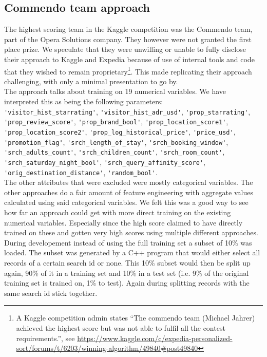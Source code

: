 \documentclass{llncs}
\begin{document}
\subsection{Commendo team approach}
The highest scoring team in the Kaggle competition was the Commendo team, part of the Opera Solutions company. They however were not granted the first place prize. We speculate that they were unwilling or unable to fully disclose their approach to Kaggle and Expedia because of use of internal tools and code that they wished to remain proprietary\footnote{A Kaggle competition admin states ``The commendo team (Michael Jahrer) achieved the highest score but was not able to fulfil all the contest requirements.'', see \url{https://www.kaggle.com/c/expedia-personalized-sort/forums/t/6203/winning-algorithm/49840#post49840}}. This made replicating their approach challenging, with only a minimal presentation to go by\cite{Jahrer2013}.\\
The approach talks about training on 19 numerical variables. We have interpreted this as being the following parameters:\\
\verb!'visitor_hist_starrating'!, \verb!'visitor_hist_adr_usd'!, \verb!'prop_starrating'!, \verb!'prop_review_score'!, \verb!'prop_brand_bool'!, \verb!'prop_location_score1'!, \verb!'prop_location_score2'!, \verb!'prop_log_historical_price'!, \verb!'price_usd'!, \verb!'promotion_flag'!, \verb!'srch_length_of_stay'!, \verb!'srch_booking_window'!, \verb!'srch_adults_count'!, \verb!'srch_children_count'!, \verb!'srch_room_count'!, \verb!'srch_saturday_night_bool'!, \verb!'srch_query_affinity_score'!, \verb!'orig_destination_distance'!, \verb!'random_bool'!. \\
The other attributes that were excluded were mostly categorical variables. The other approaches do a fair amount of feature engineering with aggregate values calculated using said categorical variables. We felt this was a good way to see how far an approach could get with more direct training on the existing numerical variables. Especially since the high score claimed to have directly trained on these and gotten very high scores using multiple different approaches.\\
During developement instead of using the full training set a subset of 10\% was loaded. The subset was generated by a C++ program that would either select all records of a certain search id or none. This 10\% subset would then be split up again, 90\% of it in a training set and 10\% in a test set (i.e. 9\% of the original training set is trained on, 1\% to test). Again during splitting records with the same search id stick together.\\
\end{document}
